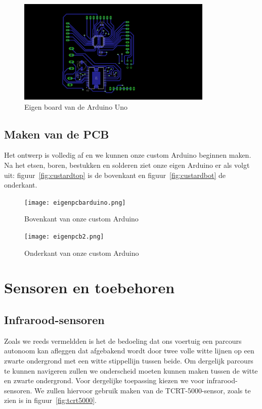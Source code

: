 \begin{figure}[H]
	\centering
	\includegraphics[height=5cm]{bottomboard.png}
	\caption{Eigen board van de Arduino Uno\label{fig:bottomboard}}
\end{figure}
\subsection{Maken van de PCB}
Het ontwerp is volledig af en we kunnen onze custom Arduino beginnen maken. Na het etsen, boren, bestukken en solderen ziet onze eigen Arduino er als volgt uit: figuur~\vref{fig:custardtop} is de bovenkant en figuur~\vref{fig:custardbot} de onderkant.

\begin{figure}[H]
	\centering
	\texttt{[image: eigenpcbarduino.png]}
	\caption{Bovenkant van onze custom Arduino\label{fig:custardtop}}
\end{figure}

\begin{figure}[H]
	\centering
	\texttt{[image: eigenpcb2.png]}
	\caption{Onderkant van onze custom Arduino\label{fig:custardbot}}
\end{figure}



 
\section{Sensoren en toebehoren}
\subsection{Infrarood-sensoren}
Zoals we reeds vermeldden is het de bedoeling dat ons voertuig een parcours autonoom kan afleggen dat afgebakend wordt door twee volle witte lijnen op een zwarte ondergrond met een witte stippellijn tussen beide. Om dergelijk parcours te kunnen navigeren zullen we onderscheid moeten kunnen maken tussen de witte en zwarte ondergrond. Voor dergelijke toepassing kiezen we voor infrarood-sensoren. We zullen hiervoor gebruik maken van de TCRT-5000-sensor, zoals te zien is in figuur~\vref{fig:tcrt5000}. 

